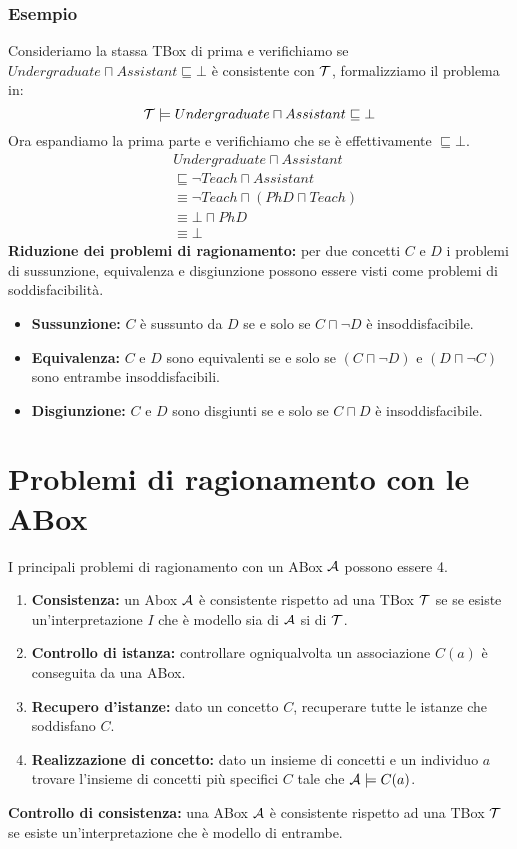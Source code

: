 \documentclass[../main.tex]{subfiles}
\begin{document}
   \subsubsection{Esempio}
   Consideriamo la stassa TBox di prima e verifichiamo se $Undergraduate \sqcap Assistant \sqsubseteq \bot$ è consistente con $\mathcal{T}$, formalizziamo il problema in:
   \begin{equation*}
      \mathcal{T} \models Undergraduate \sqcap Assistant \sqsubseteq \bot
   \end{equation*}
   Ora espandiamo la prima parte e verifichiamo che se è effettivamente $\sqsubseteq \bot$.
   \begin{align*}
      &Undergraduate \sqcap Assistant\\
      &\sqsubseteq \lnot Teach \sqcap Assistant\\
      &\equiv \lnot Teach \sqcap (PhD \sqcap Teach)\\
      &\equiv \bot \sqcap PhD\\
      &\equiv \bot
   \end{align*}
   \spazio
   \textbf{Riduzione dei problemi di ragionamento:} per due concetti $C$ e $D$ i problemi di sussunzione, equivalenza e disgiunzione possono essere visti come problemi di soddisfacibilità.
   \begin{itemize}
      \item \textbf{Sussunzione:} $C$ è sussunto da $D$ se e solo se $C \sqcap \lnot D$ è insoddisfacibile.
      \item \textbf{Equivalenza:} $C$ e $D$ sono equivalenti se e solo se $(C \sqcap \lnot D)$ e $(D \sqcap \lnot C)$ sono entrambe insoddisfacibili.
      \item \textbf{Disgiunzione:} $C$ e $D$ sono disgiunti se e solo se $C \sqcap D$ è insoddisfacibile.
   \end{itemize}

   \section{Problemi di ragionamento con le ABox}
   I principali problemi di ragionamento con un ABox $\mathcal{A}$ possono essere 4.
   \begin{enumerate}
      \item \textbf{Consistenza:} un Abox $\mathcal{A}$ è consistente rispetto ad una TBox $\mathcal{T}$ se se esiste un'interpretazione $I$ che è modello sia di $\mathcal{A}$ si di $\mathcal{T}$.
      \item \textbf{Controllo di istanza:} controllare ogniqualvolta un associazione $C(a)$ è conseguita da una ABox.
      \item \textbf{Recupero d'istanze:} dato un concetto $C$, recuperare tutte le istanze che soddisfano $C$.
      \item \textbf{Realizzazione di concetto:} dato un insieme di concetti e un individuo $a$ trovare l'insieme di concetti più specifici $C$ tale che $\mathcal{A} \models C(a)$.
   \end{enumerate}
   \vspace{2em}
   \textbf{Controllo di consistenza:} una ABox $\mathcal{A}$ è consistente rispetto ad una TBox $\mathcal{T}$ se esiste un'interpretazione che è modello di entrambe.
   
\end{document}
